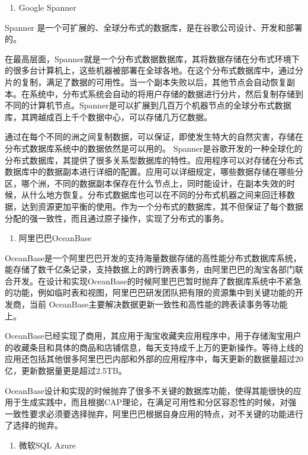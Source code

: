 \begin{enumerate}
	\item Google Spanner
\end{enumerate}

	Spanner 是一个可扩展的、全球分布式的数据库，是在谷歌公司设计、开发和部署的。
	
	在最高层面，Spanner就是一个分布式数据数据库，其将数据存储在分布式环境下的很多台计算机上，这些机器被部署在全球各地。在这个分布式数据库中，通过分片的复制，满足了数据的可用性。当一个副本失败以后，其他节点会自动恢复副本。在系统中，分布式系统会自动的将用户存储的数据进行分片，然后复制存储到不同的计算机节点。Spanner是可以扩展到几百万个机器节点的全球分布式数据库，其跨越成百上千个数据中心，可以存储几万亿数据。
	
	通过在每个不同的洲之间复制数据，可以保证，即使发生特大的自然灾害，存储在分布式数据库系统中的数据依然是可以用的。
	Spanner是谷歌开发的一种全球化的分布式数据库，其提供了很多关系型数据库的特性。应用程序可以对存储在分布式数据库中的数据副本进行详细的配置。应用可以详细规定，哪些数据存储在哪些分区，哪个洲，不同的数据副本保存在什么节点上，同时能设计，在副本失效的时候，从什么地方恢复。分布式数据库也可以在不同的分布式机器之间来回迁移数据，达到资源更加平衡的使用。作为一个分布式的数据库，其不但保证了每个数据分配的强一致性，而且通过原子操作，实现了分布式的事务。
	
	\begin{enumerate}[resume]
		\item 阿里巴巴OceanBase
	\end{enumerate}
	
	
	OceanBase是一个阿里巴巴开发的支持海量数据存储的高性能分布式数据库系统，能存储了数千亿条记录，支持数据上的跨行跨表事务，由阿里巴巴的淘宝各部门联合开发。在设计和实现OceanBase的时候阿里巴巴暂时抛弃了数据库系统中不紧急的功能，例如临时表和视图，阿里巴巴研发团队把有限的资源集中到关键功能的开发商，当前 OceanBase主要解决数据更新一致性和高性能的跨表读事务等功能上。
	
	OceanBase已经实现了商用，其应用于淘宝收藏夹应用程序中，用于存储淘宝用户的收藏条目和具体的商品和店铺信息，每天支持成千上万的更新操作。等待上线的应用还包括其他很多阿里巴巴内部和外部的应用程序中，每天更新的数据量超过20亿，更新数据量更是超过2.5TB。
	
	OceanBase设计和实现的时候抛弃了很多不关键的数据库功能，使得其能很快的应用于生成实践中，而且根据CAP理论，在满足可用性和分区容忍性的时候，对强一致性要求必须要选择抛弃，阿里巴巴根据自身应用的特点，对不关键的功能进行了选择的抛弃。
	\begin{enumerate}[resume]
		\item 微软SQL Azure
	\end{enumerate}
	
